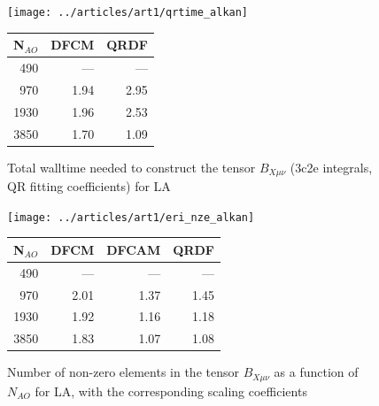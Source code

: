 \begin{figure}
\begin{minipage}[t]{0.5\textwidth}
\vspace{0pt}
\centering
\texttt{[image: ../articles/art1/qrtime\_alkan]}
\end{minipage}
\begin{minipage}{0.4\textwidth}
\vspace{0pt}
\centering
\begin{tabular}{rrr}
\hline
N$_{AO}$ & DFCM & QRDF \\ \hline
490 & --- & --- \\ 
970 & 1.94 & 2.95 \\ 
1930 & 1.96 & 2.53 \\ 
3850 & 1.70 & 1.09 \\ \hline
\end{tabular}
\end{minipage}
\caption{Total walltime needed to construct the tensor $B_{X\mu\nu}$ (3c2e integrals, QR fitting coefficients) for LA}
\label{fig:GS_BTIME_ALKAN}
\end{figure}
%
%
\begin{figure}
\begin{minipage}{0.5\textwidth}
\centering
\texttt{[image: ../articles/art1/eri\_nze\_alkan]}
\end{minipage}
\begin{minipage}{0.4\textwidth}
\centering
\begin{tabular}{rrrr}
\hline
N$_{AO}$ & DFCM & DFCAM & QRDF \\ \hline
490 & --- & --- & --- \\ 
970 & 2.01 & 1.37 & 1.45 \\ 
1930 & 1.92 & 1.16 & 1.18 \\ 
3850 & 1.83 & 1.07 & 1.08 \\ \hline
\end{tabular}
\end{minipage}
\caption{Number of non-zero elements in the tensor $B_{X\mu\nu}$ as a function of $N_{AO}$ for LA, with the corresponding scaling coefficients}
\label{fig:GS_BNZE_ALKAN}
\end{figure}
%
%
